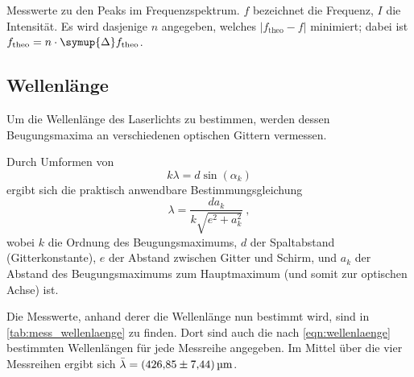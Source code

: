\begin{table}
  \centering
  \caption{
    Messwerte zu den Peaks im Frequenzspektrum.
    $f$ bezeichnet die Frequenz, $I$ die Intensität.
    Es wird dasjenige $n$ angegeben, welches $|f_\text{theo} - f|$ minimiert;
    dabei ist $f_\text{theo} = n \cdot \symup{\Delta}f_\text{theo}$.
  }
  \def\belmilliwatt{Bm}
  \label{tab:frequenzspektrum}
\end{table}



\subsection{Wellenlänge}
\label{sec:auswertung:wellenlaenge}
Um die Wellenlänge des Laserlichts zu bestimmen,
werden dessen Beugungsmaxima an verschiedenen optischen Gittern vermessen.

Durch Umformen von
\begin{equation*}
  k \lambda = d \sin(\alpha_k)
\end{equation*}
ergibt sich die praktisch anwendbare Bestimmungsgleichung
\begin{equation}
  \lambda = \frac{d a_k}{k \sqrt{e^2 + a_k^2}} \ ,
  \label{eqn:wellenlaenge}
\end{equation}
wobei $k$ die Ordnung des Beugungsmaximums,
$d$ der Spaltabstand (Gitterkonstante),
$e$ der Abstand zwischen Gitter und Schirm, %
und $a_k$ der Abstand des Beugungsmaximums zum Hauptmaximum (und somit zur optischen Achse)
ist.

Die Messwerte, anhand derer die Wellenlänge nun bestimmt wird, sind in \autoref{tab:mess_wellenlaenge} zu finden.
Dort sind auch die nach \autoref{eqn:wellenlaenge} bestimmten Wellenlängen für jede Messreihe angegeben.
Im Mittel über die vier Messreihen ergibt sich $\bar\lambda = \SI{426.85 \pm 7.44}{\micro\meter}$.

